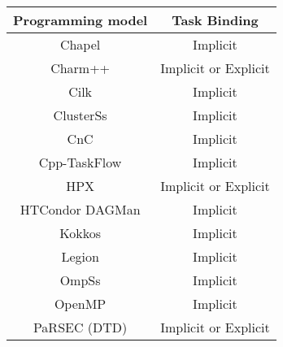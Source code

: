 \begin{tabular}{cc}
\hline
Programming model & Task Binding \\
\hline
Chapel & Implicit\\
Charm++ & Implicit or Explicit\\
Cilk & Implicit\\
ClusterSs & Implicit\\
CnC & Implicit\\
Cpp-TaskFlow & Implicit\\
HPX & Implicit or Explicit\\
HTCondor DAGMan & Implicit\\
Kokkos & Implicit\\
Legion & Implicit\\
OmpSs & Implicit\\
OpenMP & Implicit\\
PaRSEC (DTD) & Implicit or Explicit\\
\hline
\end{tabular}
